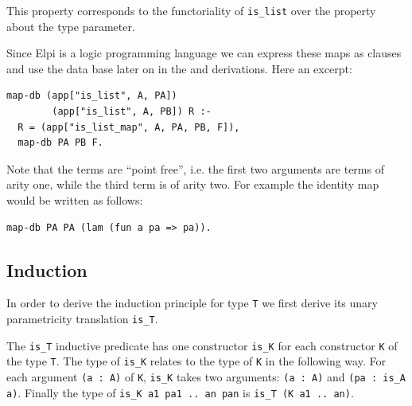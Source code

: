 \documentclass[sigplan,10pt,review]{acmart}\settopmatter{printfolios=true,printccs=false,printacmref=false}
\newcommand{\derive}[1]{\keys{#1}}
\begin{document}
\noindent
This property corresponds to the functoriality of \lstinline+is_list+
over the property about the type parameter. 

Since Elpi is a logic programming language we can express
these maps as clauses and use the data base later on in the
\derive{induction} and \derive{eqcorrect} derivations.
Here an excerpt:

\begin{minipage}{\textwidth}\begin{lstlisting}[]
map-db (app["is_list", A, PA])
        (app["is_list", A, PB]) R :-
  R = (app["is_list_map", A, PA, PB, F]),
  map-db PA PB F.
\end{lstlisting}\end{minipage}

\noindent
Note that the terms are ``point free'', i.e.
the first two arguments are terms of arity one, while
the third term is of arity two. For example the identity
map would be written as follows:

\begin{minipage}{\textwidth}\begin{lstlisting}[]
map-db PA PA (lam (fun a pa => pa)).
\end{lstlisting}\end{minipage}



\subsection{Induction} %
\label{sec:induction}

In order to derive the induction principle for type
\lstinline+T+ we first derive its unary parametricity
translation \lstinline+is_T+. 

The \lstinline+is_T+ inductive
predicate has one constructor \lstinline+is_K+ for each
constructor \lstinline+K+ of the type \lstinline+T+.
The type of \lstinline+is_K+ relates to the type of
\lstinline+K+ in the following way. For each
argument \lstinline+(a : A)+
of \lstinline+K+, \lstinline+is_K+ takes two arguments:
\lstinline+(a : A)+ and \lstinline+(pa : is_A a)+.
Finally the type of \lstinline+is_K a1 pa1 .. an pan+ is
\lstinline+is_T (K a1 .. an)+.
\end{document}
